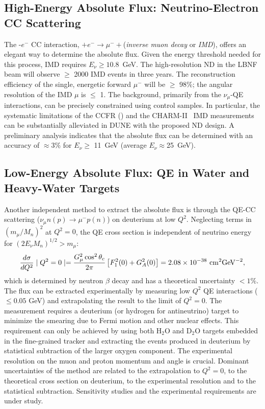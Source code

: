 \subsection{High-Energy Absolute Flux: Neutrino-Electron CC Scattering}
The \numu-$e^-$ CC interaction, \numu$ + e^- \rightarrow \mu^- +
$\nue (\emph{inverse muon decay} or \emph{IMD}), offers an elegant
way to determine the absolute flux. Given the energy threshold needed
for this process, IMD requires %
$E_\nu \geq 10.8$~\si{\GeV}.  The high-resolution ND in the
LBNF beam will observe $\geq$ \num{2000} IMD events in three
years. The reconstruction efficiency of the single, energetic %
forward $\mu^-$ will be $\geq$ 98\%; the angular resolution of the
IMD $\mu$ is $\leq$ \SI{1}{\mrad}. The background, primarily from the
$\nu_\mu$-QE interactions, can be precisely constrained using control
samples.  In particular, the systematic limitations of the CCFR
(\cite{Mishra:1989jn,Mishra:1990yf}) and %
the CHARM-II~\cite{Vilain:1996yf} IMD measurements can be
substantially alleviated in DUNE with the proposed ND design. A
preliminary analysis indicates that the absolute flux can be
determined with an accuracy of $\approx 3\%$ for $E_\nu \geq$
\SI{11}{\GeV} (average $E_\nu \approx$\SI{25}{\GeV}).
\subsection{Low-Energy Absolute Flux: QE in Water and Heavy-Water Targets}
Another  %
independent method to extract the absolute flux is through the
QE-CC scattering ($\nu_\mu n(p) \to \mu^- p(n)$) on
deuterium at low $Q^2$. Neglecting terms in $(m_\mu/M_n)^2$ at $Q^2=0$,
the QE cross section is independent of neutrino energy for $(2E_\nu
M_n)^{1/2} > m_\mu$:
\begin{equation}
\frac{d \sigma}{d Q^2}  \mid {Q^2=0}\mid = \frac{G_\mu^2 \cos^2 \theta_c}{2\pi}
\left[ F_1^2(0) + G_A^2(0) \right] = 2.08 \times 10^{-38}~\rm cm^2{\rm GeV}^{-2},
\end{equation}
%
\noindent 
which is determined by neutron $\beta$ decay and has a theoretical
uncertainty $<1\%$.  The flux can be extracted experimentally by
measuring low $Q^2$ QE interactions ($ \leq 0.05$ GeV) and extrapolating
the result to the limit of $Q^2=0$. The measurement requires a
deuterium (or hydrogen for antineutrino) target to minimize the
smearing due to Fermi motion and other nuclear effects. This
requirement can only be achieved by using both H$_2$O and D$_2$O
targets embedded in the fine-grained tracker and extracting the events
produced in deuterium by statistical subtraction of the larger oxygen
component.  The experimental resolution on the muon and proton
momentum and angle is crucial.  Dominant uncertainties of the method
are related to the extrapolation to $Q^2=0$, to the theoretical cross
section on deuterium, to the experimental resolution and to the
statistical subtraction.  Sensitivity studies and the experimental
requirements are under study.
